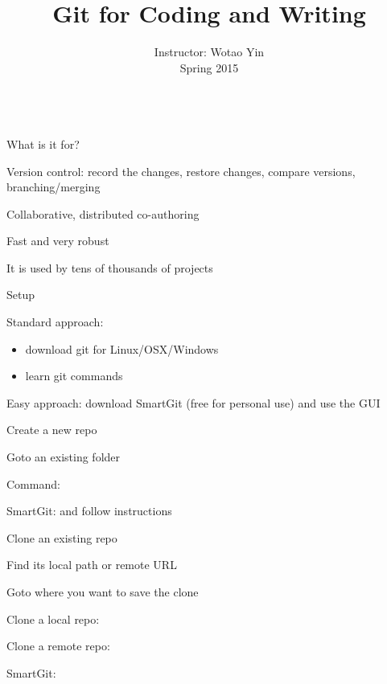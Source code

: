 \documentclass[hyperref,compress,handout,9pt,usepdftitle=false]{beamer}
\title{Git for Coding and Writing}
\author{\begin{small}Instructor: Wotao Yin\\ Spring 2015\end{small}\\[25pt]
}
\institute{
  }
\date[]{}
\begin{document}
\begin{frame}
  \titlepage
\end{frame}


\begin{frame}{What is it for?}
\begin{witemize}
\item Version control: record the changes, restore changes, compare versions, branching/merging
\item Collaborative, distributed co-authoring
\item Fast and very robust
\end{witemize}
It is used by tens of thousands of projects
\end{frame}

\begin{frame}{Setup}
\begin{witemize}
\item Standard approach:
\begin{itemize}
  \item download git for Linux/OSX/Windows
  \item learn git commands
\end{itemize}
\item Easy approach: download SmartGit (free for personal use) and use the GUI
\end{witemize}
\end{frame}

\begin{frame}{Create a new repo}
\begin{witemize}
\item Goto an existing folder
\item Command: 
\item SmartGit:  and follow instructions
\end{witemize}
\end{frame}

\begin{frame}{Clone an existing repo}
\begin{witemize}
\item Find its local path or remote URL
\item Goto where you want to save the clone
\item Clone a local repo: 
\item Clone a remote repo: 
\item SmartGit: 
\end{witemize}
\end{frame}
\end{document}
